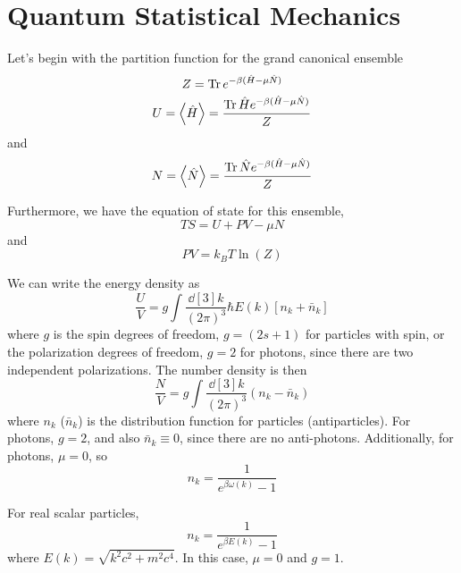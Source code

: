 \documentclass[a4paper,twoside,master.tex]{subfiles}
\begin{document}

\section{Quantum Statistical Mechanics}\label{sec:quantum_statistical_mechanics}


Let's begin with the partition function for the grand canonical ensemble
\begin{equation}
    Z = \Tr e^{- \beta (\hat{H} - \mu \hat{N})}
\end{equation}
\begin{equation}
    U = \ev{\hat{H}} = \frac{\Tr \hat{H} e^{- \beta (\hat{H} - \mu \hat{N})}}{Z}
\end{equation}
and
\begin{equation}
    N = \ev{\hat{N}} = \frac{\Tr \hat{N} e^{- \beta (\hat{H} - \mu \hat{N})}}{Z}
\end{equation}

Furthermore, we have the equation of state for this ensemble,
\begin{equation}
    TS = U + PV - \mu N
\end{equation}
and
\begin{equation}
    PV = k_B T \ln(Z)
\end{equation}

We can write the energy density as
\begin{equation}
    \frac{U}{V} = g \int \frac{\dd[3]{k}}{(2 \pi)^3} \hbar E(k) \left[ n_k + \bar{n}_k \right]
\end{equation}
where $ g $ is the spin degrees of freedom, $ g = (2s + 1) $ for particles with spin, or the polarization degrees of freedom, $ g = 2 $ for photons, since there are two independent polarizations. The number density is then
\begin{equation}
    \frac{N}{V} = g \int \frac{\dd[3]{k}}{(2 \pi)^3} (n_k - \bar{n}_k)
\end{equation}
where $ n_k $ ($ \bar{n}_k $) is the distribution function for particles (antiparticles). For photons, $ g = 2 $, and also $ \bar{n}_k \equiv 0 $, since there are no anti-photons. Additionally, for photons, $ \mu = 0 $, so
\begin{equation}
    n_k = \frac{1}{e^{\beta \omega(k)} - 1}
\end{equation}

For real scalar particles,
\begin{equation}
    n_k = \frac{1}{e^{\beta E(k)} - 1}
\end{equation}
where $ E(k) = \sqrt{k^2 c^2 + m^2 c^4} $. In this case, $ \mu = 0 $ and $ g = 1 $.
\end{document}
